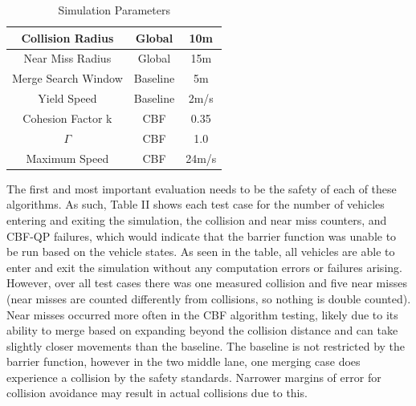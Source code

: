 \documentclass[conference]{IEEEtran}
\begin{document}
\begin{table}[htbp]
\caption{Simulation Parameters}
\centering
\begin{tabular}{|c|c|c|}
\hline
Collision Radius & Global & 10m \\ 
\hline
Near Miss Radius & Global & 15m \\ 
\hline
Merge Search Window & Baseline & 5m \\ 
\hline
Yield Speed & Baseline & 2m/s \\ 
\hline
Cohesion Factor k & CBF & 0.35 \\ 
\hline
$\Gamma$ & CBF & 1.0 \\ 
\hline
Maximum Speed & CBF & 24m/s \\ 
\hline
\end{tabular}
\end{table}

The first and most important evaluation needs to be the safety of each of these algorithms. As such, Table II shows each test case for the number of vehicles entering and exiting the simulation, the collision and near miss counters, and CBF-QP failures, which would indicate that the barrier function was unable to be run based on the vehicle states. As seen in the table, all vehicles are able to enter and exit the simulation without any computation errors or failures arising. However, over all test cases there was one measured collision and five near misses (near misses are counted differently from collisions, so nothing is double counted). Near misses occurred more often in the CBF algorithm testing, likely due to its ability to merge based on expanding beyond the collision distance and can take slightly closer movements than the baseline. The baseline is not restricted by the barrier function, however in the two middle lane, one merging case does experience a collision by the safety standards. Narrower margins of error for collision avoidance may result in actual collisions due to this.
\end{document}
